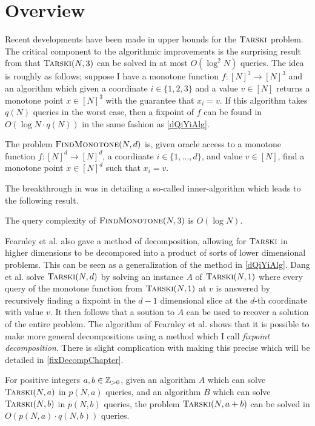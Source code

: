 \section{Overview}
Recent developments have been made in upper bounds for the $\textsc{Tarski}$ problem.
The critical component to the algorithmic improvements is
the surprising result from \citep{fasterTarski} that $\textsc{Tarski}(N, 3)$
can be solved in at most $O(\log^2 N)$ queries.
The idea is roughly as follows; suppose I have
a monotone function $f : [N]^3 \to [N]^3$ and an algorithm which
given a coordinate $i \in \{1, 2, 3\}$ and a value $v \in [N]$
returns a monotone point $x \in [N]^3$ with the guarantee
that $x_i = v$. If this algorithm takes $q(N)$ queries in the worst case,
then a fixpoint of $f$ can be found in $O(\log N \cdot q(N))$ in the
same fashion as \cref{dQiYiAlg}. 
\newcommand{\trsks}{\textsc{FindMonotone}}
\begin{definition}[\trsks]
  The problem $\trsks(N, d)$ is, given oracle access to a monotone function $f : [N]^d \to [N]^d$,
  a coordinate $i \in \{1, ..., d\}$, and value $v \in [N]$, find a monotone point $x \in [N]^d$ such that
  $x_i = v$. 
\end{definition}
The breakthrough in \citep{fasterTarski} was in detailing a so-called inner-algorithm which leads to
the following result.
\begin{theorem} \label{tightThreeDimension}
  The query complexity of $\trsks(N, 3)$ is $O(\log N)$.
\end{theorem}
Fearnley et al. also gave a method of decomposition, allowing for $\textsc{Tarski}$ in higher
dimensions to be decomposed into a product of sorts of lower
dimensional problems. This can be seen as a generalization of the method in \cref{dQiYiAlg}.
Dang et al. solve $\textsc{Tarski}(N, d)$ by solving an instance $A$ of $\textsc{Tarski}(N, 1)$ 
where every query of the monotone function from $\textsc{Tarski}(N, 1)$ at $v$ is answered by recursively finding
a fixpoint in the $d-1$ dimensional slice at the $d$-th coordinate with value $v$. It then follows that
a soution to $A$ can be used to recover a solution of the entire problem. The algorithm of
Fearnley et al. shows that it is possible to make more general decompositions using a method
which I call \emph{fixpoint decomposition}. There is slight complication with making this precise
which will be detailed in \cref{fixDecompChapter}.
\begin{theorem}\label{fixDecomp}
  For positive integers $a, b \in \mathbb{Z}_{> 0}$, given an algorithm $A$
  which can solve $\textsc{Tarski}(N, a)$ in $p(N, a)$ queries, and an algorithm $B$
  which can solve $\textsc{Tarski}(N, b)$ in $p(N, b)$ queries, the problem
  $\textsc{Tarski}(N, a + b)$ can be solved in $O(p(N, a)\cdot q(N, b))$ queries.
\end{theorem}
